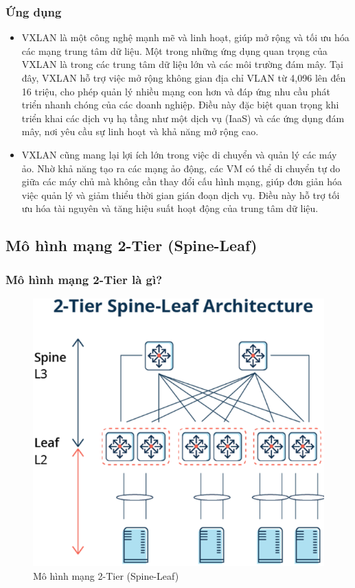 \documentclass[13pt]{article}
\begin{document}
\subsubsection{Ứng dụng}
\begin{itemize}
    \item VXLAN là một công nghệ mạnh mẽ và linh hoạt, giúp mở rộng và tối ưu hóa các mạng trung tâm dữ liệu. Một trong những ứng dụng quan trọng của VXLAN là trong các trung tâm dữ liệu lớn và các môi trường đám mây. Tại đây, VXLAN hỗ trợ việc mở rộng không gian địa chỉ VLAN từ 4,096 lên đến 16 triệu, cho phép quản lý nhiều mạng con hơn và đáp ứng nhu cầu phát triển nhanh chóng của các doanh nghiệp. Điều này đặc biệt quan trọng khi triển khai các dịch vụ hạ tầng như một dịch vụ (IaaS) và các ứng dụng đám mây, nơi yêu cầu sự linh hoạt và khả năng mở rộng cao.
    \item VXLAN cũng mang lại lợi ích lớn trong việc di chuyển và quản lý các máy ảo. Nhờ khả năng tạo ra các mạng ảo động, các VM có thể di chuyển tự do giữa các máy chủ mà không cần thay đổi cấu hình mạng, giúp đơn giản hóa việc quản lý và giảm thiểu thời gian gián đoạn dịch vụ. Điều này hỗ trợ tối ưu hóa tài nguyên và tăng hiệu suất hoạt động của trung tâm dữ liệu.
\end{itemize}

\subsection{Mô hình mạng 2-Tier (Spine-Leaf)}
\subsubsection{Mô hình mạng 2-Tier là gì?}
\begin{figure}[h!]
        \centering
        \includegraphics[width=0.7\linewidth]{image/16.png}
            \caption{Mô hình mạng 2-Tier (Spine-Leaf)}
            \label{fig:label1}
    \end{figure}
    
\end{document}

